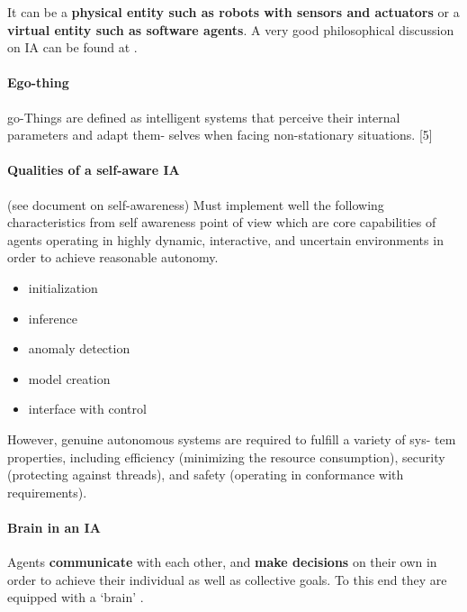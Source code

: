 \documentclass{article}
\begin{document}
	 It can be a \textbf{physical entity such as robots with sensors and actuators} or a\textbf{ virtual entity such as software agents}. A very good philosophical discussion on IA can be found at \cite{ngobye-2010-types-and-priorities-of-multi-agent-system-interactions}.
	 
	 \paragraph{Ego-thing} go-Things are defined as intelligent
	 systems that perceive their internal parameters and adapt them-
	 selves when facing non-stationary situations. \citet{kanapram-2019-dynamic-bayesian-approach-for-decision-making-in-ego-things}[5]
	 
	 \paragraph{Qualities of a self-aware IA}
	 (see document on self-awareness)
	 Must implement well the following characteristics from self awareness point of view which are core capabilities of agents operating
	 in highly dynamic, interactive, and uncertain environments
	 in order to achieve reasonable autonomy.
	 \begin{itemize}
	 	\item initialization
	 	\item inference
	 	\item anomaly detection
	 	\item model creation
	 	\item interface with control
	 \end{itemize}
	  However, genuine autonomous systems are required to fulfill a variety of sys-
	 tem properties, including efficiency (minimizing the resource
	 consumption), security (protecting against threads), and safety
	 (operating in conformance with requirements).
	 
	 \paragraph{Brain in an IA} Agents \textbf{communicate} with each other, and \textbf{make decisions} on their own in order to achieve their individual as well as collective goals. To this end they are equipped with a  ‘brain’ \citep{ciprich-2008-the-architecture-of-an-intelligent-agent-in-mas}.
	 
\end{document}
